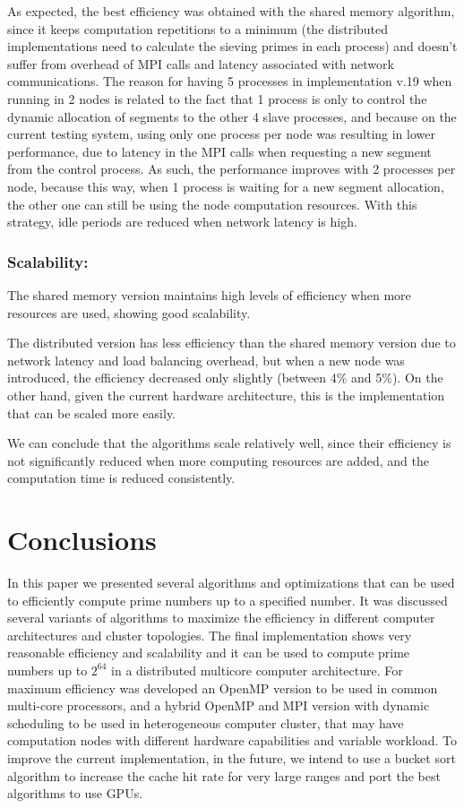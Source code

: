 \documentclass[runningheads,a4paper]{llncs}
\begin{document}
As expected, the best efficiency was obtained with the shared memory algorithm, since it keeps computation repetitions to a minimum (the distributed implementations need to calculate the sieving primes in each process) and doesn't suffer from overhead of MPI calls and latency associated with network communications. The reason for having 5 processes in implementation v.19 when running in 2 nodes is related to the fact that 1 process is only to control the dynamic allocation of segments to the other 4 slave processes, and because on the current testing system, using only one process per node was resulting in lower performance, due to latency in the MPI calls when requesting a new segment from the control process. As such, the performance improves with 2 processes per node, because this way, when 1 process is waiting for a new segment allocation, the other one can still be using the node computation resources. With this strategy, idle periods are reduced when network latency is high.


\subsubsection{Scalability:}
\label{Scalability:}

The shared memory version maintains high levels of efficiency when more resources are used, showing good scalability.

The distributed version has less efficiency than the shared memory version due to network latency and load balancing overhead, but when a new node was introduced, the efficiency decreased only slightly (between 4\% and 5\%). On the other hand, given the current hardware architecture, this is the implementation that can be scaled more easily.

We can conclude that the algorithms scale relatively well, since their efficiency is not significantly reduced when more computing resources are added, and the computation time is reduced consistently.


\section{Conclusions}
\label{Conclusions}

In this paper we presented several algorithms and optimizations that can be used to efficiently compute prime numbers up to a specified number. It was discussed several variants of algorithms to maximize the efficiency in different computer architectures and cluster topologies.
The final implementation shows very reasonable efficiency and scalability and it can be used to compute prime numbers up to $2^{64}$ in a distributed multicore computer architecture. For maximum efficiency was developed an OpenMP version to be used in common multi-core processors, and a hybrid OpenMP and MPI version with dynamic scheduling to be used in heterogeneous computer cluster, that may have computation nodes with different hardware capabilities and variable workload.
To improve the current implementation, in the future, we intend to use a bucket sort algorithm \cite{jarai2011cache} to increase the cache hit rate for very large ranges and port the best algorithms to use GPUs.
\end{document}
